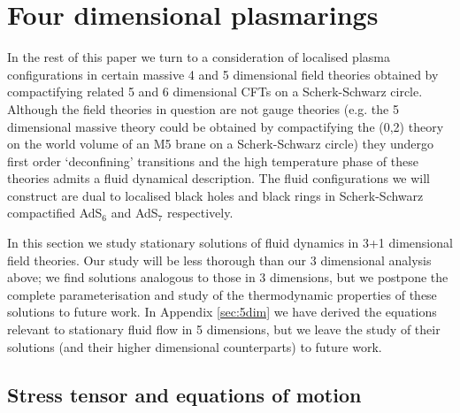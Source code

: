 
\section{Four dimensional plasmarings}\label{sec:4dim}

In the rest of this paper we turn to a consideration of localised
plasma configurations in certain massive 4 and 5 dimensional field
theories obtained by compactifying related 5 and 6 dimensional CFTs
on a Scherk-Schwarz circle. Although the field theories in question
are not gauge theories (e.g. the 5 dimensional massive theory could
be obtained by compactifying the (0,2) theory on the world volume of
an M5 brane on a Scherk-Schwarz circle) they undergo first order
`deconfining' transitions and the high temperature phase of these
theories admits a fluid dynamical description. The fluid
configurations we will construct are dual to localised black holes
and black rings in Scherk-Schwarz compactified AdS$_6$ and AdS$_7$
respectively.

In this section we study stationary solutions of fluid dynamics in 3+1
dimensional field theories. Our study will be less thorough than our 3 dimensional
analysis above; we find solutions analogous to those in 3 dimensions, but we postpone the
complete parameterisation and study of the thermodynamic properties
of these solutions to future work. In Appendix \ref{sec:5dim}
we have derived the equations relevant to stationary fluid flow in 5 dimensions, but
we leave the study of their solutions (and their higher dimensional counterparts)
to future work.



%

\subsection{Stress tensor and equations of motion}\label{sec:eom4d}

